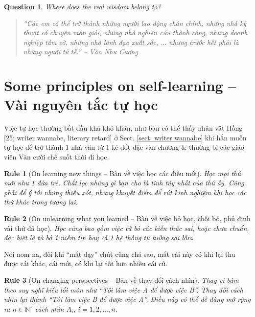 \documentclass[12pt,oneside]{book}
\newtheorem{question}{Question}
\newtheorem{Rule}{Rule}
\begin{document}
\begin{question}
	Where does the real wisdom belong to?
\end{question}

\begin{quotation}\it
	``Các em có thể trở thành những người lao động chân chính, những nhà kỹ thuật có chuyên môn giỏi, những nhà nghiên cứu thành công, những doanh nghiệp tầm cỡ, những nhà lãnh đạo xuất sắc, $\ldots$ nhưng trước hết phải là những người tử tế.'' -- {\sc Văn Như Cương}
\end{quotation}

\section{Some principles on self-learning -- Vài nguyên tắc tự học}
Việc tự học thường bắt đầu khá khó khăn, như bạn có thể thấy nhân vật {\sf Hồng [25; writer wannabe, literary retard]} ở Sect. \ref{sect: writer wannabe} khi hắn muốn tự học để trở thành 1 nhà văn từ 1 kẻ dốt đặc văn chương \& thường bị các giáo viên Văn cười chê suốt thời đi học.

\begin{Rule}[On learning new things -- Bàn về việc học các điều mới]
	Học mọi thứ mới như 1 đứa trẻ. Chắt lọc những gì bạn cho là tinh túy nhất của thứ ấy. Cũng phải để ý tới những thiếu xót, những khuyết điểm để rút kinh nghiệm khi học các thứ khác trong tương lai.
\end{Rule}

\begin{Rule}[On unlearning what you learned -- Bàn về việc bỏ học, chối bỏ, phủ định vài thứ đã học]
	Học cũng bao gồm việc từ bỏ các kiến thức sai, hoặc chưa chuẩn, đặc biệt là từ bỏ 1 niềm tin hay cả 1 hệ thống tư tưởng sai lầm.
\end{Rule}
Nói nom na, đôi khi ``mất dạy'' chút cũng chả sao, mất cái này có khi lại thu được cái khác, cái mới, có khi lại tốt hơn nhiều cái cũ.

\begin{Rule}[On changing perspectives -- Bàn về thay đổi cách nhìn]
	Thay vì bám theo suy nghĩ kiểu lối mòn như ``Tôi làm việc A để được việc B''. Thay đổi cách nhìn lại thành ``Tôi làm việc B để được việc A''. Điều này có thể dễ dàng mở rộng ra $n\in\mathbb{N}^\star$ cách nhìn $A_i$, $i = 1,2,\ldots,n$.
\end{Rule}
\end{document}
